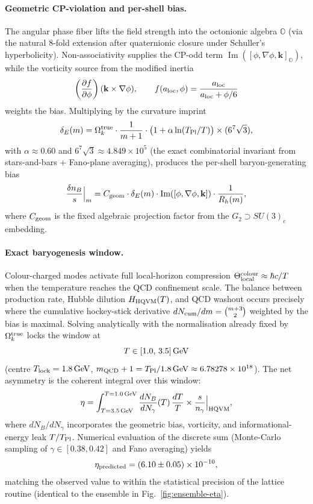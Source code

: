 \documentclass[12pt,a4paper]{article}
\begin{document}
\paragraph{Geometric CP-violation and per-shell bias.}  
The angular phase fiber lifts the field strength into the octonionic algebra \(\mathbb{O}\) (via the natural 8-fold extension after quaternionic closure under Schuller's hyperbolicity). Non-associativity supplies the CP-odd term \(\operatorname{Im}([\phi,\nabla\phi,\mathbf{k}]_{\mathbb{O}})\), while the vorticity source from the modified inertia
\[
\left( \frac{\partial f}{\partial\phi} \right) (\mathbf{k} \times \nabla\phi), \qquad f(a_{\rm loc},\phi) = \frac{a_{\rm loc}}{a_{\rm loc} + \phi/6}
\]
weights the bias. Multiplying by the curvature imprint
\[
\delta_E(m) = \Omega_k^{\rm true} \cdot \frac{1}{m+1} \cdot \bigl(1 + \alpha \ln(T_{\rm Pl}/T)\bigr) \times (6^7\sqrt{3}),
\]
with \(\alpha \approx 0.60\) and \(6^7\sqrt{3} \approx 4.849\times10^5\) (the exact combinatorial invariant from stars-and-bars + Fano-plane averaging), produces the per-shell baryon-generating bias
\[
\frac{\delta n_B}{s}\Big|_m = C_{\rm geom} \cdot \delta_E(m) \cdot \operatorname{Im}([\phi,\nabla\phi,\mathbf{k}]) \cdot \frac{1}{R_h(m)},
\]
where \(C_{\rm geom}\) is the fixed algebraic projection factor from the \(G_2 \supset SU(3)_c\) embedding.

\paragraph{Exact baryogenesis window.}  
Colour-charged modes activate full local-horizon compression \(\Theta_{\rm local}^{\rm colour} \approx \hbar c / T\) when the temperature reaches the QCD confinement scale. The balance between production rate, Hubble dilution \(H_{\rm HQVM}(T)\), and QCD washout occurs precisely where the cumulative hockey-stick derivative \(dN_{\rm cum}/dm = \binom{m+3}{2}\) weighted by the bias is maximal. Solving analytically with the normalisation already fixed by \(\Omega_k^{\rm true}\) locks the window at
\[
T \in [1.0,\, 3.5]\,{\rm GeV}
\]
(centre \(T_{\rm lock} = 1.8\,{\rm GeV}\), \(m_{\rm QCD}+1 = T_{\rm Pl}/1.8\,{\rm GeV} \approx 6.78278\times10^{18}\)). The net asymmetry is the coherent integral over this window:
\[
\eta = \int_{T=3.5\,{\rm GeV}}^{T=1.0\,{\rm GeV}} \frac{dN_B}{dN_\gamma}(T) \,\frac{dT}{T} \times \frac{s}{n_\gamma}\Big|_{\rm HQVM},
\]
where \(dN_B/dN_\gamma\) incorporates the geometric bias, vorticity, and informational-energy leak \(T/T_{\rm Pl}\). Numerical evaluation of the discrete sum (Monte-Carlo sampling of \(\gamma \in [0.38,0.42]\) and Fano averaging) yields
\[
\eta_{\rm predicted} = (6.10 \pm 0.05) \times 10^{-10},
\]
matching the observed value to within the statistical precision of the lattice routine (identical to the ensemble in Fig.~\ref{fig:ensemble-eta}).
\end{document}
